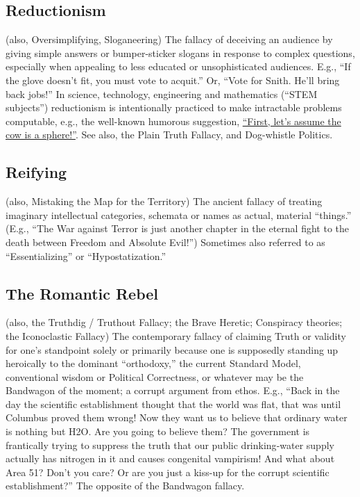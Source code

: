 \documentclass[10pt,a4paper,british]{article}
\begin{document}
\begin{multicols}{2}
	\subsection{Reductionism} (also, Oversimplifying, Sloganeering) The fallacy of deceiving an audience by giving simple answers or bumper{-}sticker slogans in response to complex questions, especially when appealing to less educated or unsophisticated audiences. E.g., ``If the glove doesn’t fit, you must vote to acquit.'' Or, ``Vote for Snith. He'll bring back jobs!'' In science, technology, engineering and mathematics (``STEM subjects'') reductionism is intentionally practiced to make intractable problems computable, e.g., the well{-}known humorous suggestion, \href{https://www.wired.com/2011/02/what-is-up-with-the-spherical-cow/}{``First, let's assume the cow is a sphere!''}. See also, the Plain Truth Fallacy, and Dog{-}whistle Politics.  

	\subsection{Reifying} (also, Mistaking the Map for the Territory) The ancient fallacy of treating imaginary intellectual categories, schemata or names as actual, material ``things.'' (E.g., ``The War against Terror is just another chapter in the eternal fight to the death between Freedom and Absolute Evil!'') Sometimes also referred to as ``Essentializing'' or “Hypostatization.” 

    \subsection{The Romantic Rebel} (also, the Truthdig / Truthout Fallacy; the Brave Heretic; Conspiracy theories; the Iconoclastic Fallacy) The contemporary fallacy of claiming Truth or validity for one's standpoint solely or primarily because one is supposedly standing up heroically to the dominant ``orthodoxy,'' the current Standard Model, conventional wisdom or Political Correctness, or whatever may be the Bandwagon of the moment; a corrupt argument from ethos. E.g., ``Back in the day the scientific establishment thought that the world was flat, that was until Columbus proved them wrong!  Now they want us to believe that ordinary water is nothing but H2O. Are you going to believe them? The government is frantically trying to suppress the truth that our public drinking{-}water supply actually has nitrogen in it and causes congenital vampirism! And what about Area 51? Don't you care? Or are you just a kiss{-}up for the corrupt scientific establishment?'' The opposite of the Bandwagon fallacy.  


\end{multicols}
\end{document}

